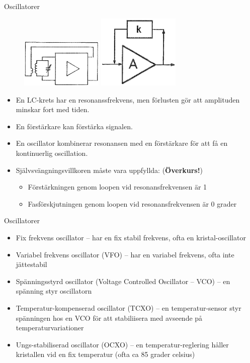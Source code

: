\documentclass{beamer}
\begin{document}
\begin{frame}{Oscillatorer}

\begin{figure}[h]
\includegraphics[width=0.35\textwidth]{images/cropped_pdfs/bild_2_3-66.pdf}
\includegraphics[width=0.35\textwidth]{images/cropped_pdfs/bild_2_3-69.pdf}
\end{figure}

\begin{itemize}
\item En LC-krets har en resonanssfrekvens, men förlusten gör att amplituden
  minskar fort med tiden.
\item En förstärkare kan förstärka signalen.
\item En oscillator kombinerar resonansen med en förstärkare för att få en kontinuerlig oscillation.
\item Självsvängningsvillkoren måste vara uppfyllda: (\textbf{Överkurs!})
  \begin{itemize}
  \item Förstärkningen genom loopen vid resonansfrekvensen är 1
  \item Fasförskjutningen genom loopen vid resonansfrekvensen är 0 grader
  \end{itemize}
\end{itemize}
\end{frame}

\begin{frame}{Oscillatorer}
  \begin{itemize}
    \item Fix frekvens oscillator -- har en fix stabil frekvens, ofta en kristal-oscillator
    \item Variabel frekvens oscillator (VFO) -- har en variabel frekvens, ofta inte jättestabil
    \item Spänningsstyrd oscillator (Voltage Controlled Oscillator -- VCO) -- en spänning styr oscillatorn
    \item Temperatur-kompenserad oscillator (TCXO) -- en temperatur-sensor styr spänningen hos en VCO för att stabiliisera med avseende på temperaturvariationer
    \item Ungs-stabiliserad oscillator (OCXO) -- en temperatur-reglering håller kristallen vid en fix temperatur (ofta ca 85 grader celsius)
  \end{itemize}
\end{frame}
\end{document}
